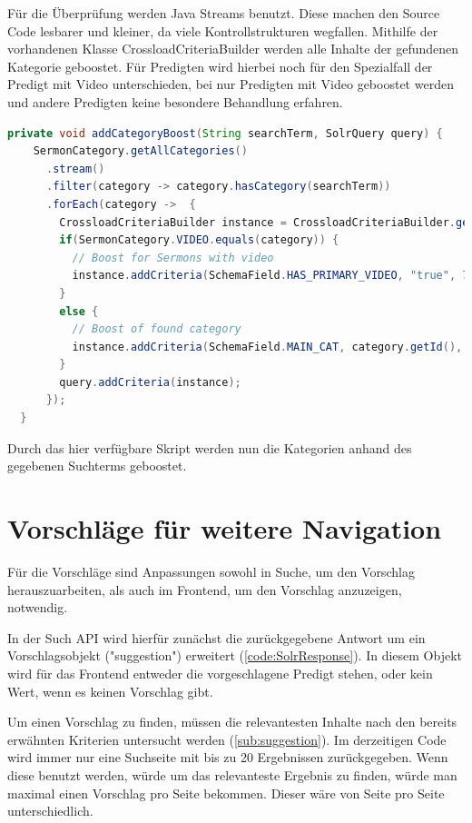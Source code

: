 Für die Überprüfung werden Java Streams benutzt.
Diese machen den Source Code lesbarer und kleiner, da viele Kontrollstrukturen wegfallen.
Mithilfe der vorhandenen Klasse CrossloadCriteriaBuilder werden alle Inhalte der gefundenen Kategorie geboostet.
Für Predigten wird hierbei noch für den Spezialfall der Predigt mit Video unterschieden, bei nur Predigten mit Video geboostet werden und andere Predigten keine besondere Behandlung erfahren.

\clearpage
\begin{lstlisting}[language=Java, title={Code für Überprüfung und Boosten der Kategorien. \cite{solr-search2022}}]
  private void addCategoryBoost(String searchTerm, SolrQuery query) {
    SermonCategory.getAllCategories()
      .stream()
      .filter(category -> category.hasCategory(searchTerm))
      .forEach(category ->  {
        CrossloadCriteriaBuilder instance = CrossloadCriteriaBuilder.getInstance();
        if(SermonCategory.VIDEO.equals(category)) {
          // Boost for Sermons with video
          instance.addCriteria(SchemaField.HAS_PRIMARY_VIDEO, "true", 75);
        }
        else {
          // Boost of found category
          instance.addCriteria(SchemaField.MAIN_CAT, category.getId(), 75);
        }
        query.addCriteria(instance);
      });
  }
\end{lstlisting}

Durch das hier verfügbare Skript werden nun die Kategorien anhand des gegebenen Suchterms geboostet.

\section{Vorschläge für weitere Navigation}
\label{sec:devSuggestions}

Für die Vorschläge sind Anpassungen sowohl in Suche, um den Vorschlag herauszuarbeiten, als auch im Frontend, um den Vorschlag anzuzeigen, notwendig.

In der Such API wird hierfür zunächst die zurückgegebene Antwort um ein Vorschlagsobjekt ("suggestion") erweitert (\ref{code:SolrResponse}).
In diesem Objekt wird für das Frontend entweder die vorgeschlagene Predigt stehen, oder kein Wert, wenn es keinen Vorschlag gibt.

Um einen Vorschlag zu finden, müssen die relevantesten Inhalte nach den bereits erwähnten Kriterien untersucht werden (\ref{sub:suggestion}).
Im derzeitigen Code wird immer nur eine Suchseite mit bis zu 20 Ergebnissen zurückgegeben.
Wenn diese benutzt werden, würde um das relevanteste Ergebnis zu finden, würde man maximal einen Vorschlag pro Seite bekommen.
Dieser wäre von Seite pro Seite unterschiedlich.

